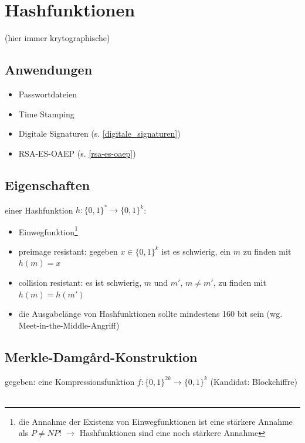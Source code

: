 \documentclass[a4paper,twoside,DIV15,BCOR12mm]{scrbook}
\begin{document}
\chapter{Hashfunktionen}

(hier immer krytographische)

\section{Anwendungen}

\begin{itemize}
	\item Passwortdateien
	\item Time Stamping
	\item Digitale Signaturen (s. \ref{digitale_signaturen})
	\item RSA-ES-OAEP (s. \ref{rsa-es-oaep})
\end{itemize}

\section{Eigenschaften}

einer Hashfunktion $h \colon {\{ 0, 1 \}}^* \rightarrow {\{ 0, 1 \}}^k$:

\begin{itemize}
	\item Einwegfunktion\footnote{die Annahme der Existenz von Einwegfunktionen ist eine stärkere Annahme als $P \neq NP$! $\rightarrow$ Hashfunktionen sind eine noch stärkere Annahme}
	\item preimage resistant: gegeben $x \in {\{ 0, 1 \}}^k$ ist es schwierig, ein $m$ zu finden mit $h(m) = x$
	\item collision resistant: es ist schwierig, $m$ und $m'$, $m \neq m'$, zu finden mit $h(m) = h(m')$
	\item die Ausgabelänge von Hashfunktionen sollte mindestens 160 bit sein (wg. Meet-in-the-Middle-Angriff)
\end{itemize}

\section{Merkle-Damg\r{a}rd-Konstruktion}

gegeben: eine Kompressionsfunktion $f \colon {\{ 0, 1 \}}^{2k} \rightarrow {\{ 0, 1 \}}^k$ (Kandidat: Blockchiffre)\\

\\
\end{document}
